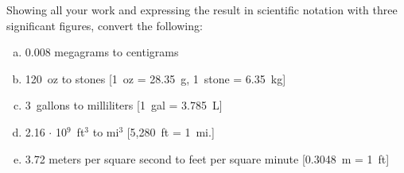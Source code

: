 \documentclass[11pt,letterpaper]{article}
\begin{document}
\newpage



 Showing all your work and expressing the result in scientific notation with three significant figures, convert the following:
	\begin{enumerate}[(a)]
	\item 0.008 megagrams to centigrams
	\item 120~oz to stones [1~oz = 28.35~g, 1~stone = 6.35~kg]
	\item 3~gallons to milliliters [1~gal = 3.785~L]
	\item 2.16 $\cdot$ 10$^9$~ft$^3$ to mi$^3$ [5,280~ft = 1~mi.]
	\item 3.72 meters per square second to feet per square minute [0.3048~m = 1~ft]
	\end{enumerate} \pspace
\end{document}
